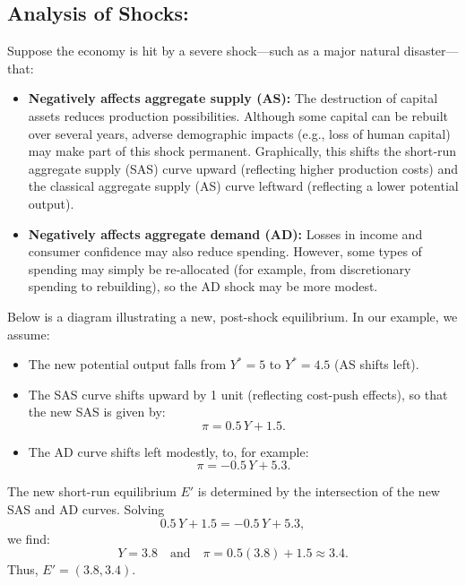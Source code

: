 \subsection*{Analysis of Shocks:}
Suppose the economy is hit by a severe shock---such as a major natural disaster---that:
\begin{itemize}
    \item \textbf{Negatively affects aggregate supply (AS):} The destruction of capital assets reduces production possibilities. Although some capital can be rebuilt over several years, adverse demographic impacts (e.g., loss of human capital) may make part of this shock permanent. Graphically, this shifts the short‑run aggregate supply (SAS) curve upward (reflecting higher production costs) and the classical aggregate supply (AS) curve leftward (reflecting a lower potential output).
    \item \textbf{Negatively affects aggregate demand (AD):} Losses in income and consumer confidence may also reduce spending. However, some types of spending may simply be re‐allocated (for example, from discretionary spending to rebuilding), so the AD shock may be more modest.
\end{itemize}
Below is a diagram illustrating a new, post-shock equilibrium. In our example, we assume:
\begin{itemize}
    \item The new potential output falls from \(Y^*=5\) to \(Y^*=4.5\) (AS shifts left).
    \item The SAS curve shifts upward by 1 unit (reflecting cost-push effects), so that the new SAS is given by: 
    \[
    \pi = 0.5\,Y + 1.5.
    \]
    \item The AD curve shifts left modestly, to, for example: 
    \[
    \pi = -0.5\,Y + 5.3.
    \]
\end{itemize}
The new short-run equilibrium \(E'\) is determined by the intersection of the new SAS and AD curves. Solving
\[
0.5\,Y + 1.5 = -0.5\,Y + 5.3,
\]
we find:
\[
Y = 3.8 \quad \text{and} \quad \pi = 0.5(3.8) + 1.5 \approx 3.4.
\]
Thus, \(E'=(3.8,3.4)\).
